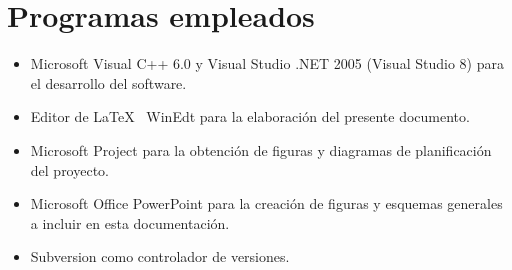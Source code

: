 \chapter*{Programas empleados}

\begin{itemize}
  \item Microsoft Visual C++ 6.0 y  Visual Studio .NET 2005 (Visual Studio 8) para el desarrollo del software.
  \item Editor de \LaTeX ~ WinEdt para la elaboraci\'{o}n del presente documento.
  \item Microsoft Project para la obtenci\'{o}n de figuras y diagramas de planificaci\'{o}n del proyecto.
  \item Microsoft Office PowerPoint para la creaci\'{o}n de figuras y esquemas generales a incluir en esta documentaci\'{o}n.
  \item Subversion como controlador de versiones.
\end{itemize}
